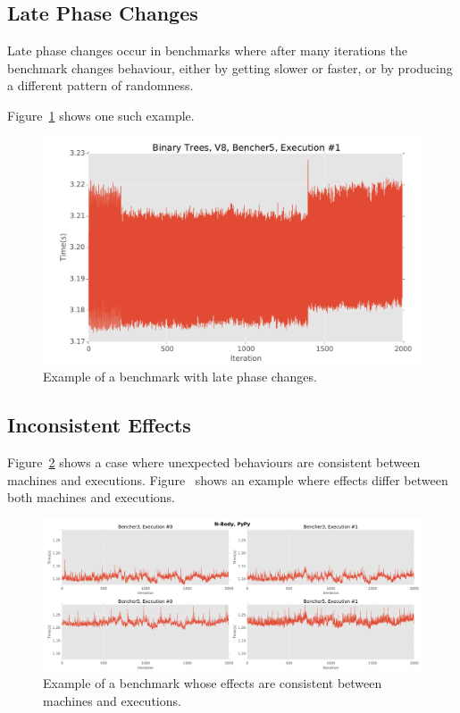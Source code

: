 \documentclass[10pt,preprint]{sigplanconf}
\begin{document}
\subsection{Late Phase Changes}
\label{sub:phase}

Late phase changes occur in benchmarks where after many iterations the benchmark
changes behaviour, either by getting slower or faster, or by producing a
different pattern of randomness.

Figure~\ref{fig:examples:late1} shows one such example.

\begin{figure}[h!]
\centering
\includegraphics[width=.46\textwidth]{examples/late1}
\caption{Example of a benchmark with late phase changes.}
\label{fig:examples:late1}
\end{figure}

\subsection{Inconsistent Effects}
\label{sub:inconsistent}


Figure~\ref{fig:examples:consistent_weirdness1} shows a case where
unexpected behaviours are consistent between machines and executions.
Figure~\label{fig:examples:inconsistent_weirdness1} shows an example where
effects differ between both machines and executions.

\begin{figure}[h!]
\centering
\includegraphics[width=\textwidth]{examples/consistent_weirdness1}
\caption{Example of a benchmark whose effects are consistent between machines and executions.}
\label{fig:examples:consistent_weirdness1}
\end{figure}
\end{document}
